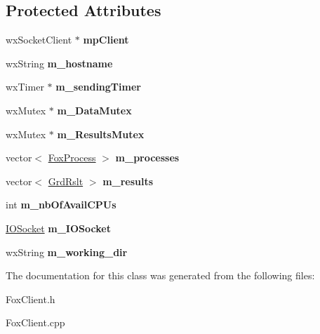 \subsection*{Protected Attributes}
\begin{DoxyCompactItemize}
\item 
\mbox{\label{class_fox_client_a1fa6a8a5d5250b5dcb0e93fe1e4f9049}} 
wx\+Socket\+Client $\ast$ {\bfseries mp\+Client}
\item 
\mbox{\label{class_fox_client_aa393caaa2aa27536a6111fac70777830}} 
wx\+String {\bfseries m\+\_\+hostname}
\item 
\mbox{\label{class_fox_client_a3218d7e4a919e10b11368dc9d0f41a73}} 
wx\+Timer $\ast$ {\bfseries m\+\_\+sending\+Timer}
\item 
\mbox{\label{class_fox_client_acd9e813338b3a66031943eb3a705743b}} 
wx\+Mutex $\ast$ {\bfseries m\+\_\+\+Data\+Mutex}
\item 
\mbox{\label{class_fox_client_a7516701722a0ecaa6e52a3a654fc9f81}} 
wx\+Mutex $\ast$ {\bfseries m\+\_\+\+Results\+Mutex}
\item 
\mbox{\label{class_fox_client_afca3aa411d5feb206b470fdb8303e1b3}} 
vector$<$ \mbox{\hyperlink{class_fox_process}{Fox\+Process}} $>$ {\bfseries m\+\_\+processes}
\item 
\mbox{\label{class_fox_client_a3a957a53bf8d345d41f439986327ef53}} 
vector$<$ \mbox{\hyperlink{class_grd_rslt}{Grd\+Rslt}} $>$ {\bfseries m\+\_\+results}
\item 
\mbox{\label{class_fox_client_a486a35168cb3558bc7e134cefc7eee42}} 
int {\bfseries m\+\_\+nb\+Of\+Avail\+C\+P\+Us}
\item 
\mbox{\label{class_fox_client_a4880effb143993cef67103d35e5ba6ec}} 
\mbox{\hyperlink{class_i_o_socket}{I\+O\+Socket}} {\bfseries m\+\_\+\+I\+O\+Socket}
\item 
\mbox{\label{class_fox_client_a5596b6aa8a3aa24d21405dbf7db20b21}} 
wx\+String {\bfseries m\+\_\+working\+\_\+dir}
\end{DoxyCompactItemize}


The documentation for this class was generated from the following files\+:\begin{DoxyCompactItemize}
\item 
Fox\+Client.\+h\item 
Fox\+Client.\+cpp\end{DoxyCompactItemize}
